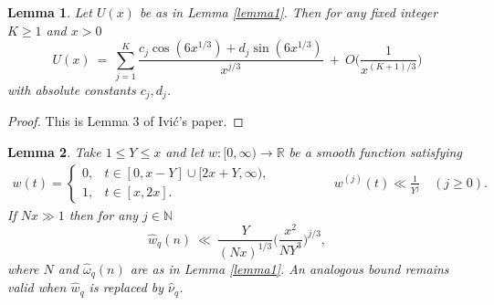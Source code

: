 \documentclass[oneside,reqno,10pt]{amsart}
\numberwithin{equation}{section}
\theoremstyle{plain}
\newtheorem{lemma}{Lemma}
\theoremstyle{definition}
\numberwithin{equation}{section}
\begin{document}
\begin{lemma}\label{lemma4}
Let $U(x)$ be as in Lemma \ref{lemma1}. Then for any fixed integer $K\geq 1$ and $x >0$
\begin{equation*}
    U(x)\ =\ \sum_{j=1}^{K}\frac{c_j \cos(6x^{1/3})+d_j \sin{(6x^{1/3})}}{x^{j/3}}\ +\ O\Big(\frac{1}{x^{(K+1)/3}}\Big)
\end{equation*}
with absolute constants $c_j,d_j$.
\end{lemma}
\begin{proof}
    This is Lemma 3 of Ivić's \cite{Iv} paper.
\end{proof}
\begin{lemma}\label{lemma5}
    Take $1\leq Y\leq x$ and let $w:[0,\infty)\to \mathbb{R}$ be a smooth function satisfying
    \begin{align*}
        w(t) = 
        \begin{cases} 
            0, & t \in [0, x-Y]\cup [2x+Y,\infty), \\ 
            1, & t \in [x, 2x]. 
        \end{cases} \hspace{2cm} w^{(j)}(t) \ll \frac{1}{Y^j} \quad (j \geq 0).
\end{align*}
If $Nx\gg 1$ then for any $j\in \mathbb{N}$
\begin{equation*}
    \hat{w}_q(n) \ \ll\ \frac{Y}{(Nx)^{1/3}} \Big( \frac{x^2}{NY^3}\Big)^{j/3},
\end{equation*}
where $N$ and $\hat{\omega}_q(n)$ are as in Lemma \ref{lemma1}. An analogous bound remains valid when $\hat{w}_q$ is replaced by $\hat{\nu}_q$.
\end{lemma}
\end{document}

